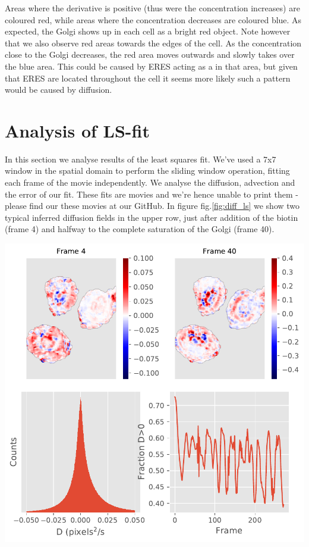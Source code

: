 \documentclass[12pt,a4paper,]{Dissertate}
\let\origfigure\figure
\let\endorigfigure\endfigure
\renewenvironment{figure}[1][2] {
    \expandafter\origfigure\expandafter[H]
} {
    \endorigfigure
}
\begin{document}
Areas where the derivative is positive (thus were the concentration
increases) are coloured red, while areas where the concentration
decreases are coloured blue. As expected, the Golgi shows up in each
cell as a bright red object. Note however that we also observe red areas
towards the edges of the cell. As the concentration close to the Golgi
decreases, the red area moves outwards and slowly takes over the blue
area. This could be caused by ERES acting as a in that area, but given
that ERES are located throughout the cell it seems more likely such a
pattern would be caused by diffusion.

\hypertarget{analysis-of-ls-fit}{%
\section{Analysis of LS-fit}\label{analysis-of-ls-fit}}

In this section we analyse results of the least squares fit. We've used
a 7x7 window in the spatial domain to perform the sliding window
operation, fitting each frame of the movie independently. We analyse the
diffusion, advection and the error of our fit. These fits are movies and
we're hence unable to print them - please find our these movies at our
GitHub. In figure fig.\ref{fig:diff_ls} we show two typical inferred
diffusion fields in the upper row, just after addition of the biotin
(frame 4) and halfway to the complete saturation of the Golgi (frame
40).

\begin{figure}
\hypertarget{fig:diff_ls}{%
\centering
\includegraphics{source/figures/pdf/Diff.pdf}
\caption{Analysis of the inferred diffusion field. The upper row shows
the inferred field at two frames, while the lower row shows the
distribution of values and the fraction of physical values as a function
of time.}\label{fig:diff_ls}
}
\end{figure}
\end{document}
